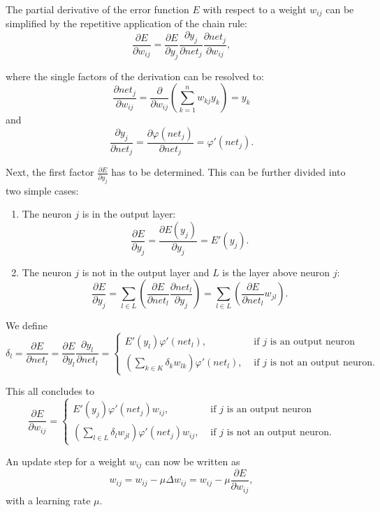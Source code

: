 The partial derivative of the error function $E$ with respect to a weight $w_{ij}$ can be simplified by the repetitive application of the chain rule:
\[
	\frac{\partial E}{\partial w_{ij}} = \frac{\partial E}{\partial y_j} \frac{\partial y_j}{\partial net_j} \frac{\partial net_j}{\partial w_{ij}} ,
\]
 
where the single factors of the derivation can be resolved to:
\[
	\frac{\partial net_j}{\partial w_{ij}} = \frac{\partial}{\partial w_{ij}} ( \sum_{k=1}^n w_{kj} y_k ) = y_k
\]
and 
\[
	\frac{\partial y_j}{\partial net_j} =  \frac{\partial \varphi(net_j)}{\partial net_j} = \varphi'(net_j).
\]


Next, the first factor $\frac{\partial E}{\partial y_j}$ has to be determined. This can be further divided into two simple cases:
\begin{enumerate}
\item The neuron $j$ is in the output layer:
\[
\frac{\partial E}{\partial y_j} = \frac{\partial E(y_j)}{\partial y_j} = E'(y_j).
\] 

\item The neuron $j$ is not in the output layer and $L$ is the layer above neuron $j$:
\[
\frac{\partial E}{\partial y_j} = \sum_{l \in L}( \frac{\partial E}{\partial net_l} \frac{\partial net_l}{\partial y_j} )  = \sum_{l \in L}( \frac{\partial E}{\partial net_l} w_{jl} ).
\] 
\end{enumerate}
 
We define 
\[
\delta_l = \frac{\partial E}{\partial net_l} = \frac{\partial E}{\partial y_l} \frac{\partial y_l}{\partial net_l} =
\begin{cases}
E'(y_l) \varphi'(net_l), & \text{  if } j \text{ is an output neuron} \\
(\sum_{k \in K} \delta_k w_{lk}) \varphi'(net_l), & \text{  if } j \text{ is not an output neuron.}
\end{cases}
\]

This all concludes to 
\[
\frac{\partial E}{\partial w_{ij}} = 
\begin{cases}
E'(y_j) \varphi'(net_j) w_{ij}, & \text{  if } j \text{ is an output neuron} \\
(\sum_{l \in L} \delta_l w_{jl}) \varphi'(net_j) w_{ij}, & \text{  if } j \text{ is not an output neuron.}
\end{cases}
\]

An update step for a weight $w_{ij}$ can now be written as
\[
w_{ij} = w_{ij} - \mu \Delta w_{ij} = w_{ij} - \mu \frac{\partial E}{\partial w_{ij}},
\]
with a learning rate $\mu$.

